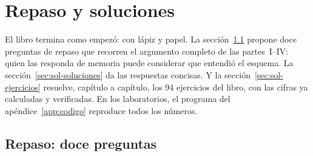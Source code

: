 
\chapter{Repaso y soluciones}\label{ch:soluciones}

\begin{roadmap}
El libro termina como empezó: con lápiz y papel. La
sección~\ref{sec:sol-repaso} propone doce preguntas de repaso que
recorren el argumento completo de las partes~I--IV: quien las
responda de memoria puede considerar que entendió el esquema. La
sección~\ref{sec:sol-soluciones} da las respuestas concisas. Y la
sección~\ref{sec:sol-ejercicios} resuelve, capítulo a capítulo, los
$94$ ejercicios del libro, con las cifras ya calculadas y
verificadas. En los laboratorios, el programa del
apéndice~\ref{app:codigo} reproduce todos los números.
\end{roadmap}

\section{Repaso: doce preguntas}\label{sec:sol-repaso}

